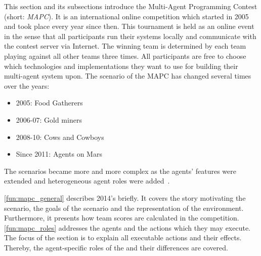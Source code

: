 This section and its subsections introduce the Multi-Agent Programming Contest (short: \emph{MAPC}).
It is an international online competition which started in 2005 and took place every year since then.
This tournament is held as an online event in the sense that all participants run their systems locally and communicate with the contest server via Internet.
The winning team is determined by each team playing against all other teams three times.
All participants are free to choose which technologies and implementations they want to use for building their multi-agent system upon.
The scenario of the MAPC has changed several times over the years:
\begin{itemize}
	\item 2005: Food Gatherers
	\item 2006-07: Gold miners
	\item 2008-10: Cows and Cowboys
  \item Since 2011: Agents on Mars
\end{itemize}
The scenarios became more and more complex as the agents' features were extended and heterogeneous agent roles were added~\cite{behrens_multi-agent_2012}. %

\autoref{fun:mapc_general} describes 2014's \mars{} briefly.
It covers the story motivating the scenario, the goals of the scenario and the representation of the environment.
Furthermore, it presents how team scores are calculated in the competition.
\autoref{fun:mapc_roles} addresses the agents and the actions which they may execute.
The focus of the section is to explain all executable actions and their effects.
Thereby, the agent-specific roles of the \mars{} and their differences are covered.




